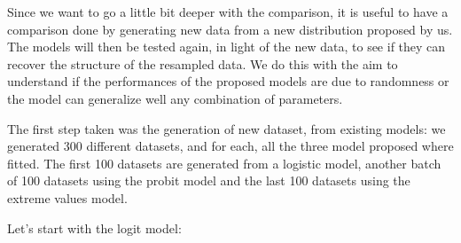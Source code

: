 \documentclass[]{article}
\begin{document}
Since we want to go a little bit deeper with the comparison, it is
useful to have a comparison done by generating new data from a new
distribution proposed by us. The models will then be tested again, in
light of the new data, to see if they can recover the structure of the
resampled data. We do this with the aim to understand if the
performances of the proposed models are due to randomness or the model
can generalize well any combination of parameters.

The first step taken was the generation of new dataset, from existing
models: we generated 300 different datasets, and for each, all the three
model proposed where fitted. The first 100 datasets are generated from a
logistic model, another batch of 100 datasets using the probit model and
the last 100 datasets using the extreme values model.

Let's start with the logit model:
\end{document}
